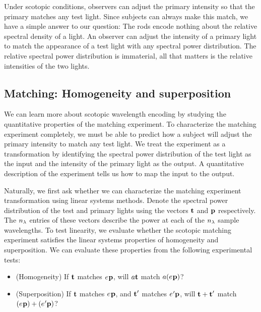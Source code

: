 Under scotopic conditions, observers can adjust
the primary intensity so that
the primary matches any test light.
Since subjects can always make this match,
we have a simple answer to our question:
The rods encode nothing about
the relative spectral density of a light.
An observer can adjust the intensity of
a primary light to match the appearance of
a test light with any spectral power distribution.
The relative spectral power distribution is immaterial,
all that matters is the relative intensities of the two lights.

\subsection*{Matching: Homogeneity and superposition}

We can learn more about scotopic wavelength
encoding by studying the quantitative properties
of the matching experiment.
To characterize the matching experiment completely,
we must be able to predict how a subject will adjust
the primary intensity to match any test light.
We treat the experiment as a transformation by identifying
the spectral power distribution of the test light as the input
and the intensity of the primary light as the output.
A quantitative description of the experiment tells us
how to map the input to the output.

Naturally, we first ask whether
we can characterize the matching experiment
transformation using linear systems methods.
Denote the spectral power distribution
of the test and primary lights using the vectors
$\mbox{${\bf t}$}$ and $\mbox{$\bf p$}$ respectively.
The $\mbox{$n_\lambda$}$ entries of these vectors describe the power
at each of the $\mbox{$n_\lambda$}$ sample wavelengths.
To test linearity,
we evaluate whether the scotopic matching experiment
satisfies the linear systems properties of
homogeneity and superposition.
We can evaluate these properties from the following experimental tests:

\begin{itemize}
\item  (Homogeneity) If $\mbox{${\bf t}$}$ matches $\mbox{$e_{}$} \mbox{$\bf p$}$, 
will $a \mbox{${\bf t}$}$ match $ a (\mbox{$e_{}$} \mbox{$\bf p$})$?
\item (Superposition)
If $\mbox{${\bf t}$}$ matches $\mbox{$e_{}$} \mbox{$\bf p$}$, and
${\mbox{${\bf t}$} '}$ matches ${\mbox{$e_{}$} '} \mbox{$\bf p$}$, will 
$\mbox{${\bf t}$} + \mbox{${\bf t}$} '$ match $( \mbox{$e_{}$} \mbox{$\bf p$} ) + ( \mbox{$e_{}$} ' \mbox{$\bf p$} )$?
\end{itemize}

